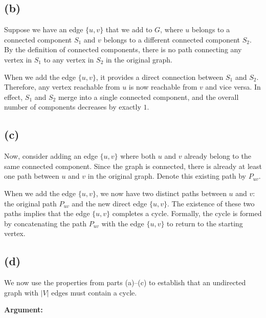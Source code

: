 \documentclass[11pt]{article}
\begin{document}
    \subsection*{(b)}
    
    Suppose we have an edge \(\{u,v\}\) that we add to \(G\), where \(u\) belongs to a connected component \(S_1\) and \(v\) belongs to a different connected component \(S_2\). By the definition of connected components, there is no path connecting any vertex in \(S_1\) to any vertex in \(S_2\) in the original graph.  
    
    When we add the edge \(\{u,v\}\), it provides a direct connection between \(S_1\) and \(S_2\). Therefore, any vertex reachable from \(u\) is now reachable from \(v\) and vice versa. In effect, \(S_1\) and \(S_2\) merge into a single connected component, and the overall number of components decreases by exactly \(1\).
    
    \subsection*{(c)}
    
    Now, consider adding an edge \(\{u,v\}\) where both \(u\) and \(v\) already belong to the same connected component. Since the graph is connected, there is already at least one path between \(u\) and \(v\) in the original graph. Denote this existing path by \(P_{uv}\).  
    
    When we add the edge \(\{u,v\}\), we now have two distinct paths between \(u\) and \(v\): the original path \(P_{uv}\) and the new direct edge \(\{u,v\}\). The existence of these two paths implies that the edge \(\{u,v\}\) completes a cycle. Formally, the cycle is formed by concatenating the path \(P_{uv}\) with the edge \(\{u,v\}\) to return to the starting vertex.
    
    \subsection*{(d)}
    
    We now use the properties from parts (a)--(c) to establish that an undirected graph with \(|V|\) edges must contain a cycle.
    
    \medskip
    \noindent \textbf{Argument:}
    
\end{document}
